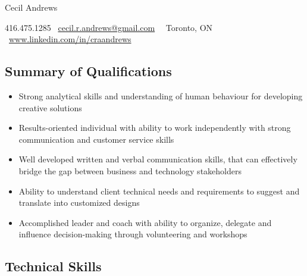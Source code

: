 \documentclass{article}
\begin{document}
\begin{center}
   
    \Huge\textcolor{ablue}{Cecil Andrews}

\end{center}

\begin{center}
 
416.475.1285 \vert  \ \href{mailto:cecil.r.andrews@gmail.com}{cecil.r.andrews@gmail.com}  \ \vert  \ Toronto, ON \vert  \ \href{http://www.linkedin.com/in/craandrews}{www.linkedin.com/in/craandrews}

\end{center}

\begin{center}
\section*{Summary of Qualifications}
\end{center}


\begin{flushleft}
\begin{itemize}
\item Strong analytical skills and understanding of human behaviour for developing creative solutions\\
\item Results-oriented individual with ability to work independently with strong communication and customer service skills \\
\item Well developed written and verbal communication skills, that can effectively bridge the gap between business and technology stakeholders \\
\item Ability to understand client technical needs and requirements to suggest and translate into customized designs\\
\item Accomplished leader and  coach with ability to organize, delegate and influence decision-making through volunteering and workshops
\end{itemize}
\end{flushleft}

\begin{center}
\section*{Technical Skills}
\end{center}
\end{document}
